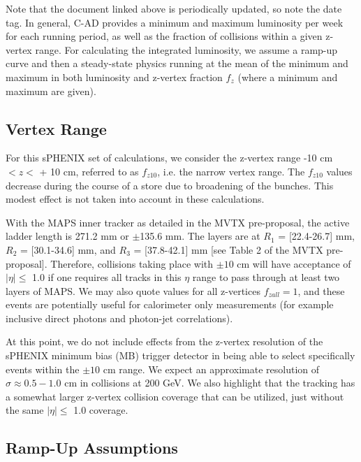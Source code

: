 \bigskip
{\color{blue}{http://www.rhichome.bnl.gov/RHIC/Runs/RhicProjections.pdf}} 
\bigskip

Note that the document linked above is periodically updated, so note the date tag.  In general, C-AD provides a minimum and maximum luminosity per week for each running period, as well as the fraction of collisions within a given z-vertex range. For calculating the integrated luminosity, we assume a ramp-up curve and then a steady-state physics running at the mean of the minimum and maximum in both luminosity and z-vertex fraction $f_{z}$ (where a minimum and maximum are given).   

\subsection{Vertex Range}

For this sPHENIX set of calculations, we consider the z-vertex range -10 cm $< z < $ + 10 cm, referred to as $f_{z10}$, i.e. the narrow vertex range.
The $f_{z10}$ values decrease during the course of a store due to broadening of the bunches.   This modest effect is not taken into account in these calculations.

With the MAPS inner tracker as detailed in the MVTX pre-proposal, the active ladder length is 271.2 mm or $\pm$135.6 mm.  The layers are at $R_1$ = [22.4-26.7] mm, $R_2$ = [30.1-34.6] mm, and $R_3$ = [37.8-42.1] mm [see Table 2 of the MVTX pre-proposal]. Therefore, collisions taking place with $\pm 10$ cm will have acceptance of $|\eta| \le$ 1.0 if one requires all tracks in this $\eta$ range to pass through at least two layers of MAPS.    We may also quote values for all z-vertices $f_{zall}=1$, and these events are potentially useful for calorimeter only measurements (for example inclusive direct photons and photon-jet correlations).   

At this point, we do not include effects from the z-vertex resolution of the sPHENIX minimum bias (MB) trigger detector in being able to select specifically events within the $\pm 10$ cm range.    We expect an approximate resolution of $\sigma \approx 0.5-1.0$ cm in \auau collisions at 200 GeV.    We also highlight that the tracking has a somewhat larger z-vertex collision coverage that can be utilized, just without the same $|\eta| \le$ 1.0 coverage.

\subsection{Ramp-Up Assumptions}

